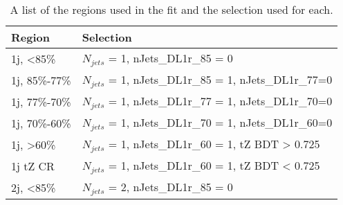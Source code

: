 \begin{table}[H] 
\centering
\caption{A list of the regions used in the fit and the selection used for each.}
\begin{tabular}{l|l}
\hline\hline
Region & Selection            \\
\hline
\hline
1j, <85\%       & $N_{jets}$ = 1, nJets\_DL1r\_85 = 0            \\
1j, 85\%-77\%   & $N_{jets}$ = 1, nJets\_DL1r\_85 = 1, nJets\_DL1r\_77=0                     \\
1j, 77\%-70\%   & $N_{jets}$ = 1, nJets\_DL1r\_77 = 1, nJets\_DL1r\_70=0                     \\
1j, 70\%-60\%   & $N_{jets}$ = 1, nJets\_DL1r\_70 = 1, nJets\_DL1r\_60=0                      \\
1j, >60\%       & $N_{jets}$ = 1, nJets\_DL1r\_60 = 1, tZ BDT > 0.725 \\
1j tZ CR        & $N_{jets}$ = 1, nJets\_DL1r\_60 = 1, tZ BDT < 0.725 \\
2j, <85\%       & $N_{jets}$ = 2, nJets\_DL1r\_85 = 0                    \\

\end{tabular}
\end{table}
